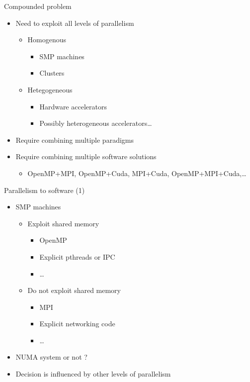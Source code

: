 \documentclass{beamer}
\begin{document}
\begin{frame}{Compounded problem}

  \begin{itemize}
  \item Need to exploit all levels of parallelism
    \begin{itemize}
    \item Homogenous
      \begin{itemize}
      \item SMP machines
      \item Clusters
      \end{itemize}
    \item Hetegogeneous
      \begin{itemize}
      \item Hardware accelerators
      \item Possibly heterogeneous accelerators\ldots
      \end{itemize}
    \end{itemize}
  \item Require combining multiple paradigms
  \item Require combining multiple software solutions
    \begin{itemize}
    \item OpenMP+MPI, OpenMP+Cuda, MPI+Cuda, OpenMP+MPI+Cuda,\ldots
    \end{itemize}
\end{itemize}
\end{frame}

\begin{frame}{Parallelism to software (1)}

  \begin{itemize}
  \item SMP machines
    \begin{itemize}
    \item Exploit shared memory
      \begin{itemize}
      \item OpenMP
      \item Explicit pthreads or IPC
      \item \ldots
      \end{itemize}
    \item Do not exploit shared memory
      \begin{itemize}
      \item MPI
      \item Explicit networking code
      \item \ldots
      \end{itemize}
    \end{itemize}
  \item NUMA system or not ?
  \item Decision is influenced by other  levels of parallelism
  \end{itemize}
\end{frame}
\end{document}
